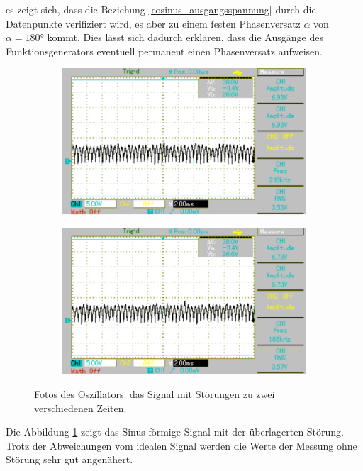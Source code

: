 es zeigt sich, dass die Beziehung \eqref{cosinus_ausgangsspannung} durch die Datenpunkte verifiziert wird, es aber zu einem festen Phasenversatz $\alpha$ von $\alpha=180°$ kommt.
Dies lässt sich dadurch erklären, dass die Ausgänge des Funktionsgenerators eventuell permanent einen Phasenversatz aufweisen.
\begin{figure}[htb]
	\centering
	\begin{subfigure}{0.49\textwidth}
		\includegraphics[width=\textwidth]{Bilder/MAP002.pdf}
	\end{subfigure}
	\begin{subfigure}{0.49\textwidth}
		\includegraphics[width=\textwidth]{Bilder/MAP003.pdf}
	\end{subfigure}
	\caption{Fotos des Oszillators: das Signal mit Störungen zu zwei verschiedenen Zeiten. \cite{GIMP}}
	\label{fig:stoerung}
\end{figure}
Die Abbildung \ref{fig:stoerung} zeigt das Sinus-förmige Signal mit der überlagerten Störung. 
Trotz der Abweichungen vom idealen Signal werden die Werte der Messung ohne Störung sehr gut angenähert.
